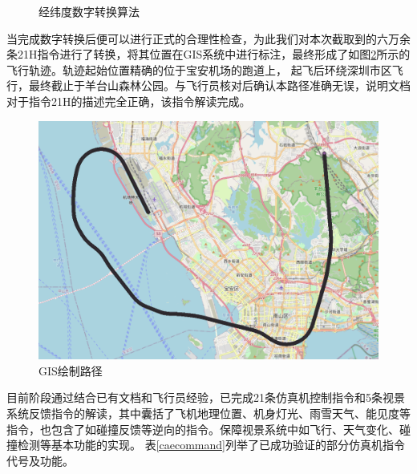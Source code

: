 \begin{figure}[h!]
    \centering
     
    \caption{经纬度数字转换算法}
    \label{llconv}
\end{figure}
\par
当完成数字转换后便可以进行正式的合理性检查，为此我们对本次截取到的六万余条21H指令进行了转换，将其位置在GIS系统中进行标注，最终形成了如图\ref{GIStrace}所示的飞行轨迹。轨迹起始位置精确的位于宝安机场的跑道上，
起飞后环绕深圳市区飞行，最终截止于羊台山森林公园。与飞行员核对后确认本路径准确无误，说明文档对于指令21H的描述完全正确，该指令解读完成。
\begin{figure}[h!]
    \begin{center}
        \includegraphics[width=.9\textwidth]{pictures/trace.png}
        \caption{GIS绘制路径}
        \label{GIStrace}
    \end{center}
\end{figure}
\par
目前阶段通过结合已有文档和飞行员经验，已完成21条仿真机控制指令和5条视景系统反馈指令的解读，其中囊括了飞机地理位置、机身灯光、雨雪天气、能见度等指令，也包含了如碰撞反馈等逆向的指令。保障视景系统中如飞行、天气变化、碰撞检测等基本功能的实现。
表\ref{caecommand}列举了已成功验证的部分仿真机指令代号及功能。
